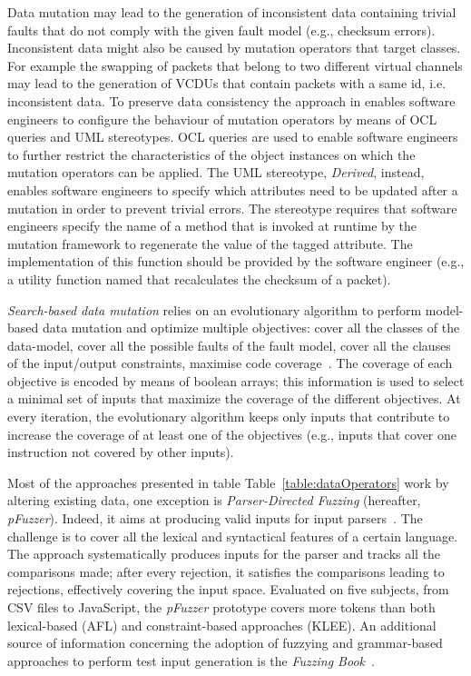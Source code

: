 





Data mutation may lead to the generation of inconsistent data containing trivial faults that do not comply with the given fault model (e.g., checksum errors). 
Inconsistent data might also be caused by mutation operators that target classes. For example the swapping of packets that belong to two different virtual channels may lead to the generation of VCDUs that contain packets with a same id, i.e. inconsistent data. To preserve data consistency the approach in \cite{di2015generating} enables software engineers to configure the behaviour of mutation operators by means of OCL queries and UML stereotypes. OCL queries are used to enable software engineers to further restrict the characteristics of the object instances on which the mutation operators can be applied.   The UML stereotype, \emph{Derived}, instead, enables software engineers to specify which attributes need to be updated after a mutation in order to prevent trivial errors. The stereotype requires that software engineers specify the name of a method that is invoked at runtime by the mutation framework to regenerate the value of the tagged attribute. The implementation of this function should be provided by the software engineer (e.g., a utility function named that recalculates the checksum of a packet). 



\emph{Search-based data mutation} relies on an evolutionary algorithm to perform model-based data mutation and optimize multiple objectives:  
cover all the classes of the data-model, cover all the possible faults of the fault model, cover all the clauses of the input/output constraints,
maximise code coverage~\cite{di2015evolutionary}.
The coverage of each objective is encoded by means of boolean arrays; this information is used to select a minimal set of inputs that maximize the coverage of the different objectives.
At every iteration, the evolutionary algorithm keeps only inputs that contribute to increase the coverage of at least one of the objectives (e.g., inputs that cover one instruction not covered by other inputs).


Most of the approaches presented in table Table~\ref{table:dataOperators} work by altering existing data, one exception is
\emph{Parser-Directed Fuzzing} (hereafter, \emph{pFuzzer}). Indeed, it aims at producing valid inputs for input parsers~\cite{mathis2019parser}. The challenge is to cover all the lexical and syntactical features of a certain language. The approach systematically produces inputs for the parser and tracks all the comparisons made; after every rejection, it satisfies the comparisons leading to rejections, effectively covering the input space. 
Evaluated on five subjects, from CSV files to JavaScript, the \emph{pFuzzer} prototype covers more tokens than both lexical-based (AFL) and constraint-based approaches (KLEE).
An additional source of information concerning the adoption of fuzzying and grammar-based approaches to perform test input generation is the \emph{Fuzzing Book}~\cite{fuzzingbook2019:GrammarFuzzer}.

\clearpage